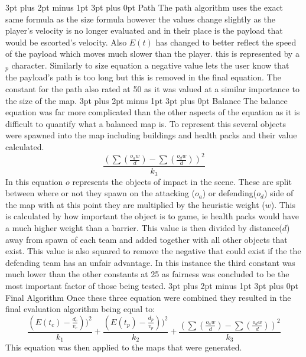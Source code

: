 \documentclass[12pt,a4paper,oneside]{book}
\makeatletter
\renewcommand\subsection{\@startsection {subsection}{1}{2mm} %
                               {3pt plus 2pt minus 1pt} %
                               {3pt plus 0pt} %
                               {\normalfont\bfseries}}
\makeatother
\begin{document}
\subsection{Path}
The path algorithm uses the exact same formula as the size formula however the values change slightly as the player's velocity is no longer evaluated and in their place is the payload that would be escorted's velocity. Also \(E(t) \) has changed to better reflect the speed of the payload which moves much slower than the player. this is represented by a \(_p \) character. Similarly to size equation a negative value lets the user know that the payload's path is too long but this is removed in the final equation. The constant for the path also rated at 50 as it was valued at a similar importance to the size of the map.  
\subsection{Balance}
The balance equation was far more complicated than the other aspects of the equation as it is difficult to quantify what a balanced map is. To represent this several objects were spawned into the map including buildings and health packs and their value calculated.
\begin{equation}
\frac{(\sum(\frac{o_a  w}{d}) - \sum(\frac{o_d w}{d})) ^2}{k_3} 
\end{equation}
In this equation \(o\) represents the objects of impact in the scene. These are split between where or not they spawn on the attacking (\(o_a\)) or defending(\(o_d\)) side of the map with at this point they are multiplied by the heuristic weight (\(w\)). This is calculated by how important the object is to game, ie health packs would have a much higher weight than a barrier. This value is then divided by distance(\(d\)) away from spawn of each team and added together with all other objects that exist. This value is also squared to remove the negative that could exist if the the defending team has an unfair advantage. In this instance the third constant was much lower than the other constants at 25 as fairness was concluded to be the most important factor of those being tested.
\subsection{Final Algorithm}
Once these three equation were combined they resulted in the final evaluation algorithm being equal to:  
\begin{equation}
\frac{(E(t_c)  - \frac{d_c}{v_c}))^2}{k_1} + \frac{(E(t_p)  - \frac{d_p}{v_p}))^2}{k_2} + \frac{(\sum(\frac{o_a  w}{d}) - \sum(\frac{o_d w}{d})) ^2}{k_3} 
\end{equation} 
This equation was then applied to the maps that were generated.
\end{document}
